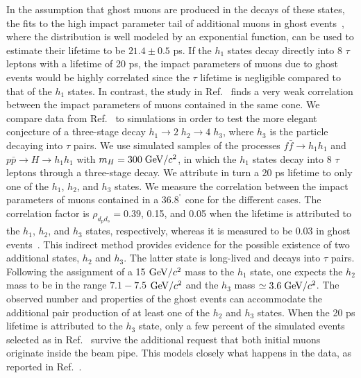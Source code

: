 \documentclass[twocolumn,10pt,prl,preprint,floatfix,nofootinbib,superscriptaddress,showpacs,amssymb]{revtex4}
\def\deg{^\circ}
\begin{document}
In the assumption that ghost muons are produced in the decays of these states,
 the fits to the high impact parameter tail of additional muons in ghost
 events~\cite{a0disc}, where the distribution is well modeled by an exponential function,
 can be used to estimate  their lifetime to be $21.4 \pm 0.5$ ps. If the $h_1$ states decay
 directly into 8 $\tau$ leptons with a lifetime of 20 ps, the impact
 parameters of muons due to ghost events would be highly correlated since
 the $\tau$ lifetime is negligible compared to that of the $h_1$ states.
 In contrast, the study in Ref.~\cite{a0disc} finds a very weak correlation
 between the impact parameters of muons contained in the same cone.
 We compare data from Ref.~\cite{a0disc} to simulations in order to test
 the more elegant conjecture of a three-stage decay
 $h_1 \rightarrow 2\;h_2 \rightarrow 4\;h_3 $, where $h_3$ is the
  particle decaying into $\tau$ pairs. 
 We use  simulated samples  of the processes $f\bar{f} \rightarrow h_1 h_1$
 and $p\bar{p}\rightarrow H\rightarrow h_1 h_1$ with $m_H=300 \; {\rm GeV/}c^2$,
 in which the $h_1$ states decay into 8 $\tau$
 leptons through a three-stage decay.
  We attribute in turn a 20 ps
 lifetime to only one of the $h_1$, $h_2$, and $h_3$ states. We measure the
 correlation between the impact parameters of muons contained in a 
 $36.8^{\deg}$ cone for the different cases. The correlation factor is
 $\rho_{d_p d_s}=0.39 $, 0.15, and 0.05 when the lifetime is attributed to
 the $h_1$, $h_2$, and $h_3$ states, respectively, whereas it is measured to
 be 0.03 in ghost events~\cite{a0disc}.
 This indirect  method provides evidence for the possible
 existence of two additional states, $h_2$ and $h_3$. The latter state is
 long-lived and decays into $\tau$ pairs. Following the assignment of a
 15 ${\rm GeV/}c^2$ mass to the $h_1$ state, one expects the $h_2$ mass to be in
 the range $7.1-7.5$ ${\rm GeV/}c^2$ and the $h_3$ mass $\simeq 3.6 \; {\rm GeV/}c^2$. 
 The observed number and properties of the ghost events can  accommodate
 the additional pair production of at least one of the $h_2$ and $ h_3$ states.
 When the 20 ps lifetime is
 attributed to the $h_3$ state, only a few percent of the simulated events 
 selected as in Ref.~\cite{a0disc} survive the additional
 request that both initial muons originate inside the beam pipe. This models
 closely what happens in the data, as reported in
 Ref.~\cite{a0disc}. 
\end{document}
